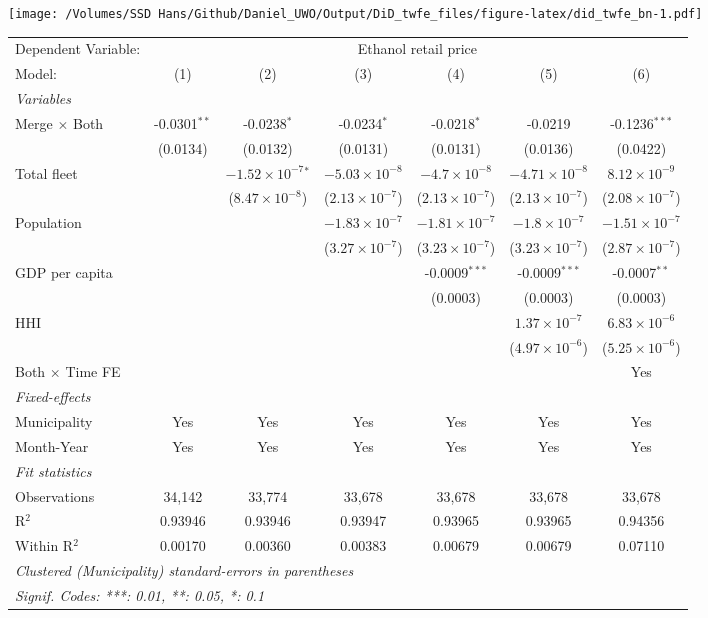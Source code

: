 \documentclass[
]{article}
\begin{document}
\texttt{[image: /Volumes/SSD Hans/Github/Daniel\_UWO/Output/DiD\_twfe\_files/figure-latex/did\_twfe\_bn-1.pdf]}

\begin{tabular}{lcccccc}
\tabularnewline\midrule\midrule
Dependent Variable:&\multicolumn{6}{c}{Ethanol retail price}\\
Model:&(1) & (2) & (3) & (4) & (5) & (6)\\
\midrule \emph{Variables}&   &   &   &   &   &  \\
Merge $\times $ Both & -0.0301$^{**}$ & -0.0238$^{*}$ & -0.0234$^{*}$ & -0.0218$^{*}$ & -0.0219 & -0.1236$^{***}$\\
  &(0.0134) & (0.0132) & (0.0131) & (0.0131) & (0.0136) & (0.0422)\\
Total fleet &    & $-1.52\times 10^{-7}$$^{*}$ & $-5.03\times 10^{-8}$ & $-4.7\times 10^{-8}$ & $-4.71\times 10^{-8}$ & $8.12\times 10^{-9}$\\
  &   & ($8.47\times 10^{-8}$) & ($2.13\times 10^{-7}$) & ($2.13\times 10^{-7}$) & ($2.13\times 10^{-7}$) & ($2.08\times 10^{-7}$)\\
Population &    &    & $-1.83\times 10^{-7}$ & $-1.81\times 10^{-7}$ & $-1.8\times 10^{-7}$ & $-1.51\times 10^{-7}$\\
  &   &    & ($3.27\times 10^{-7}$) & ($3.23\times 10^{-7}$) & ($3.23\times 10^{-7}$) & ($2.87\times 10^{-7}$)\\
GDP per capita &    &    &    & -0.0009$^{***}$ & -0.0009$^{***}$ & -0.0007$^{**}$\\
  &   &    &    & (0.0003) & (0.0003) & (0.0003)\\
HHI &    &    &    &    & $1.37\times 10^{-7}$ & $6.83\times 10^{-6}$\\
  &   &    &    &    & ($4.97\times 10^{-6}$) & ($5.25\times 10^{-6}$)\\
Both $\times$ Time FE &  &  &  &  &  & Yes\\
\midrule \emph{Fixed-effects}&   &   &   &   &   &  \\
Municipality & Yes & Yes & Yes & Yes & Yes & Yes\\
Month-Year & Yes & Yes & Yes & Yes & Yes & Yes\\
\midrule \emph{Fit statistics}&  & & & & & \\
Observations & 34,142&33,774&33,678&33,678&33,678&33,678\\
R$^2$ & 0.93946&0.93946&0.93947&0.93965&0.93965&0.94356\\
Within R$^2$ & 0.00170&0.00360&0.00383&0.00679&0.00679&0.07110\\
\midrule\midrule\multicolumn{7}{l}{\emph{Clustered (Municipality) standard-errors in parentheses}}\\
\multicolumn{7}{l}{\emph{Signif. Codes: ***: 0.01, **: 0.05, *: 0.1}}\\
\end{tabular}
\end{document}
